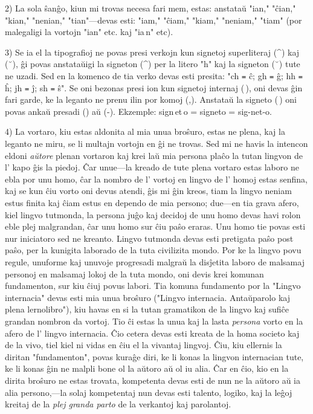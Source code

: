 \documentclass[12pt,twoside]{book}
\begin{document}
2) La sola ŝanĝo, kiun mi trovas necesa fari mem, estas: anstataŭ "ian," "ĉian," "kian," "nenian," "tian"—devas esti: "iam," "ĉiam," "kiam," "neniam," "tiam" (por malegaligi la vortojn "ian" etc. kaj "ia\,n" etc).

3) Se ia el la tipografioj ne povas presi verkojn kun signetoj superliteraj (\^{}) kaj (˘), ĝi povas anstataŭigi la signeton (\^{}) per la litero "h" kaj la signeton (˘) tute ne uzadi. Sed en la komenco de tia verko devas esti presita: "ch \texttt{=} ĉ; gh \texttt{=} ĝ; hh \texttt{=} ĥ; jh \texttt{=} ĵ; sh \texttt{=} ŝ". Se oni bezonas presi ion kun signetoj internaj (\,), oni devas ĝin fari garde, ke la leganto ne prenu ilin por komoj (,). Anstataŭ la signeto (\,) oni povas ankaŭ presadi ({}) aŭ (-). Ekzemple: sign\,et\,o = sign{}et{}o = sig-net-o.

4) La vortaro, kiu estas aldonita al mia unua broŝuro, estas ne plena, kaj la leganto ne miru, se li multajn vortojn en ĝi ne trovas. Sed mi ne havis la intencon eldoni \emph{aŭtore} plenan vortaron kaj krei laŭ mia persona plaĉo la tutan lingvon de l' kapo ĝis la piedoj. Ĉar unue—la kreado de tute plena vortaro estas laboro ne ebla por unu homo, ĉar la nombro de l' vortoj en lingvo de l' homoj estas senfina, kaj se kun ĉiu vorto oni devus atendi, ĝis mi ĝin kreos, tiam la lingvo neniam estus finita kaj ĉiam estus en dependo de mia persono; due—en tia grava afero, kiel lingvo tutmonda, la persona juĝo kaj decidoj de unu homo devas havi rolon eble plej malgrandan, ĉar unu homo sur ĉiu paŝo eraras. Unu homo tie povas esti nur iniciatoro sed ne kreanto. Lingvo tutmonda devas esti pretigata paŝo post paŝo, per la kunigita laborado de la tuta civilizita mondo. Por ke la lingvo povu regule, unuforme kaj unuvoje progresadi malgraŭ la disĵetita laboro de malsamaj personoj en malsamaj lokoj de la tuta mondo, oni devis krei komunan fundamenton, sur kiu ĉiuj povus labori. Tia komuna fundamento por la "Lingvo internacia" devas esti mia unua broŝuro ("Lingvo internacia. Antaŭparolo kaj plena lernolibro"), kiu havas en si la tutan gramatikon de la lingvo kaj sufiĉe grandan nombron da vortoj. Tio ĉi estas la unua kaj la lasta \emph{persona} vorto en la afero de l' lingvo internacia. Ĉio cetera devas esti kreata de la homa societo kaj de la vivo, tiel kiel ni vidas en ĉiu el la vivantaj lingvoj. Ĉiu, kiu ellernis la diritan "fundamenton", povas kuraĝe diri, ke li konas la lingvon internacian tute, ke li konas ĝin ne malpli bone ol la aŭtoro aŭ ol iu alia. Ĉar en ĉio, kio en la dirita broŝuro ne estas trovata, kompetenta devas esti de nun ne la aŭtoro aŭ ia alia persono,—la solaj kompetentaj nun devas esti talento, logiko, kaj la leĝoj kreitaj de la \emph{plej granda parto} de la verkantoj kaj parolantoj.
\end{document}
